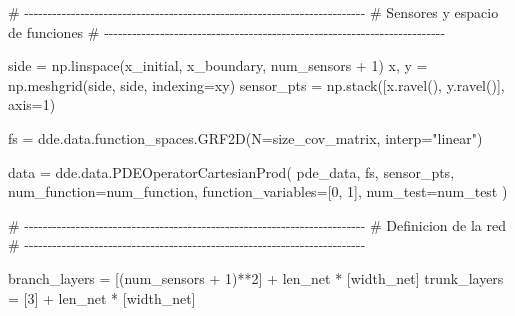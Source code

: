 \documentclass[
  spanish,
  us-letterpaper,
]{scrreprt}
\newenvironment{Shaded}{\begin{snugshade}}{\end{snugshade}}
\newcommand{\CommentTok}[1]{\textcolor[rgb]{0.37,0.37,0.37}{#1}}
\newcommand{\DecValTok}[1]{\textcolor[rgb]{0.68,0.00,0.00}{#1}}
\newcommand{\NormalTok}[1]{\textcolor[rgb]{0.00,0.23,0.31}{#1}}
\newcommand{\OperatorTok}[1]{\textcolor[rgb]{0.37,0.37,0.37}{#1}}
\newcommand{\StringTok}[1]{\textcolor[rgb]{0.13,0.47,0.30}{#1}}
\theoremstyle{plain}
\theoremstyle{definition}
\theoremstyle{remark}
\begin{document}
\begin{Shaded}
\begin{Highlighting}[]
\CommentTok{\# {-}{-}{-}{-}{-}{-}{-}{-}{-}{-}{-}{-}{-}{-}{-}{-}{-}{-}{-}{-}{-}{-}{-}{-}{-}{-}{-}{-}{-}{-}{-}{-}{-}{-}{-}{-}{-}{-}{-}{-}{-}{-}{-}{-}{-}{-}{-}{-}{-}{-}{-}{-}{-}{-}{-}{-}{-}{-}{-}{-}{-}{-}{-}{-}{-}{-}{-}{-}{-}{-}{-}{-}{-}}
\CommentTok{\# Sensores y espacio de funciones}
\CommentTok{\# {-}{-}{-}{-}{-}{-}{-}{-}{-}{-}{-}{-}{-}{-}{-}{-}{-}{-}{-}{-}{-}{-}{-}{-}{-}{-}{-}{-}{-}{-}{-}{-}{-}{-}{-}{-}{-}{-}{-}{-}{-}{-}{-}{-}{-}{-}{-}{-}{-}{-}{-}{-}{-}{-}{-}{-}{-}{-}{-}{-}{-}{-}{-}{-}{-}{-}{-}{-}{-}{-}{-}{-}{-}}

\NormalTok{side }\OperatorTok{=}\NormalTok{ np.linspace(x\_initial, x\_boundary, num\_sensors }\OperatorTok{+} \DecValTok{1}\NormalTok{)}
\NormalTok{x, y }\OperatorTok{=}\NormalTok{ np.meshgrid(side, side, indexing}\OperatorTok{=}\StringTok{\textquotesingle{}xy\textquotesingle{}}\NormalTok{)}
\NormalTok{sensor\_pts }\OperatorTok{=}\NormalTok{ np.stack([x.ravel(), y.ravel()], axis}\OperatorTok{=}\DecValTok{1}\NormalTok{)}

\NormalTok{fs }\OperatorTok{=}\NormalTok{ dde.data.function\_spaces.GRF2D(N}\OperatorTok{=}\NormalTok{size\_cov\_matrix, }
\NormalTok{                                    interp}\OperatorTok{=}\StringTok{"linear"}\NormalTok{)}

\NormalTok{data }\OperatorTok{=}\NormalTok{ dde.data.PDEOperatorCartesianProd(}
\NormalTok{    pde\_data,}
\NormalTok{    fs,}
\NormalTok{    sensor\_pts,}
\NormalTok{    num\_function}\OperatorTok{=}\NormalTok{num\_function,}
\NormalTok{    function\_variables}\OperatorTok{=}\NormalTok{[}\DecValTok{0}\NormalTok{, }\DecValTok{1}\NormalTok{],}
\NormalTok{    num\_test}\OperatorTok{=}\NormalTok{num\_test}
\NormalTok{)}

\CommentTok{\# {-}{-}{-}{-}{-}{-}{-}{-}{-}{-}{-}{-}{-}{-}{-}{-}{-}{-}{-}{-}{-}{-}{-}{-}{-}{-}{-}{-}{-}{-}{-}{-}{-}{-}{-}{-}{-}{-}{-}{-}{-}{-}{-}{-}{-}{-}{-}{-}{-}{-}{-}{-}{-}{-}{-}{-}{-}{-}{-}{-}{-}{-}{-}{-}{-}{-}{-}{-}{-}{-}{-}{-}{-}}
\CommentTok{\# Definicion de la red}
\CommentTok{\# {-}{-}{-}{-}{-}{-}{-}{-}{-}{-}{-}{-}{-}{-}{-}{-}{-}{-}{-}{-}{-}{-}{-}{-}{-}{-}{-}{-}{-}{-}{-}{-}{-}{-}{-}{-}{-}{-}{-}{-}{-}{-}{-}{-}{-}{-}{-}{-}{-}{-}{-}{-}{-}{-}{-}{-}{-}{-}{-}{-}{-}{-}{-}{-}{-}{-}{-}{-}{-}{-}{-}{-}{-}}

\NormalTok{branch\_layers }\OperatorTok{=}\NormalTok{ [(num\_sensors }\OperatorTok{+} \DecValTok{1}\NormalTok{)}\OperatorTok{**}\DecValTok{2}\NormalTok{] }\OperatorTok{+}\NormalTok{ len\_net }\OperatorTok{*}\NormalTok{ [width\_net]}
\NormalTok{trunk\_layers }\OperatorTok{=}\NormalTok{ [}\DecValTok{3}\NormalTok{] }\OperatorTok{+}\NormalTok{ len\_net }\OperatorTok{*}\NormalTok{ [width\_net]}


\end{Highlighting}
\end{Shaded}
\end{document}
